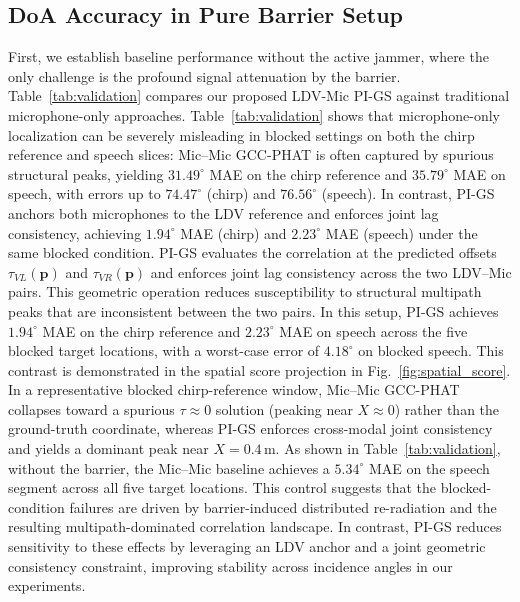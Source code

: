 \documentclass{Interspeech}
\begin{document}
\subsection{DoA Accuracy in Pure Barrier Setup}




First, we establish baseline performance without the active jammer, where the only challenge is the profound signal attenuation by the barrier. Table~\ref{tab:validation} compares our proposed LDV-Mic PI-GS against traditional microphone-only approaches.  Table~\ref{tab:validation} shows that microphone-only localization can be severely misleading in blocked settings on both the chirp reference and speech slices: Mic--Mic GCC-PHAT is often captured by spurious structural peaks, yielding $31.49^\circ$ MAE on the chirp reference and $35.79^\circ$ MAE on speech, with errors up to $74.47^\circ$ (chirp) and $76.56^\circ$ (speech). In contrast, PI-GS anchors both microphones to the LDV reference and enforces joint lag consistency, achieving $1.94^\circ$ MAE (chirp) and $2.23^\circ$ MAE (speech) under the same blocked condition. PI-GS evaluates the correlation at the predicted offsets $\tau_{VL}(\mathbf{p})$ and $\tau_{VR}(\mathbf{p})$ and enforces joint lag consistency across the two LDV--Mic pairs. This geometric operation reduces susceptibility to structural multipath peaks that are inconsistent between the two pairs. In this setup, PI-GS achieves $1.94^\circ$ MAE on the chirp reference and $2.23^\circ$ MAE on speech across the five blocked target locations, with a worst-case error of $4.18^\circ$ on blocked speech. This contrast is demonstrated in the spatial score projection in Fig.~\ref{fig:spatial_score}. In a representative blocked chirp-reference window, Mic--Mic GCC-PHAT collapses toward a spurious $\tau \approx 0$ solution (peaking near $X \approx 0$) rather than the ground-truth coordinate, whereas PI-GS enforces cross-modal joint consistency and yields a dominant peak near $X=0.4$\,m. As shown in Table~\ref{tab:validation}, without the barrier, the Mic--Mic baseline achieves a $5.34^\circ$ MAE on the speech segment across all five target locations. This control suggests that the blocked-condition failures are driven by barrier-induced distributed re-radiation and the resulting multipath-dominated correlation landscape. In contrast, PI-GS reduces sensitivity to these effects by leveraging an LDV anchor and a joint geometric consistency constraint, improving stability across incidence angles in our experiments.
\end{document}
